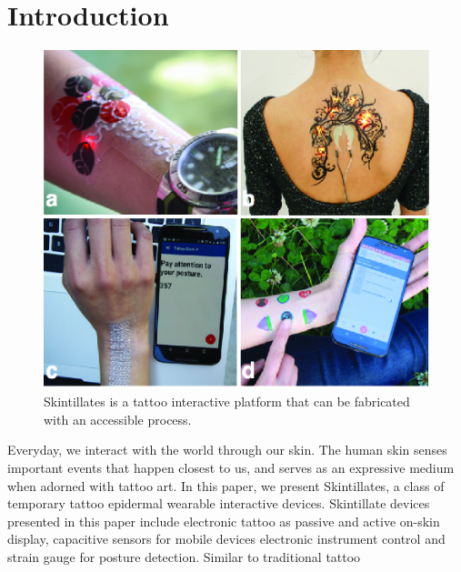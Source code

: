 \documentclass{sigchi}
\begin{document}

\section{Introduction}


\begin{figure}[!h]
\centering
\includegraphics[width=1\columnwidth]{figures/Figure1}
\caption{Skintillates is a tattoo interactive platform that can be fabricated with an accessible process.}
\label{fig:figure1}
\end{figure}
Everyday, we interact with the world through our skin. The human skin senses important events that happen closest to us, and serves as an expressive medium when adorned with tattoo art. In this paper, we present Skintillates, a class of temporary tattoo epidermal wearable interactive devices. %
Skintillate devices presented in this paper include electronic tattoo as passive and active on-skin display, capacitive sensors for mobile devices electronic instrument control and strain gauge for posture detection. Similar to traditional tattoo%
\end{document}
